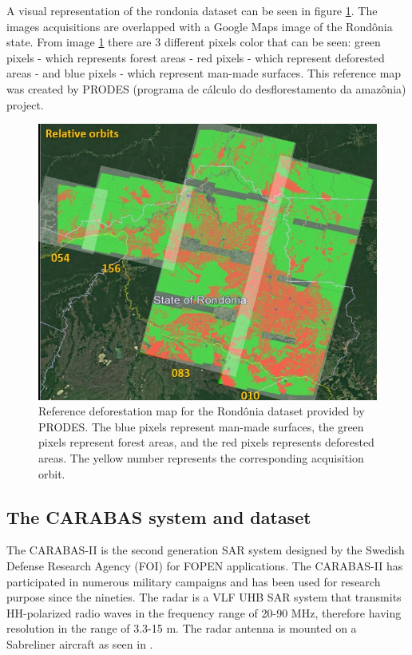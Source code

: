 A visual representation of the rondonia dataset can be seen in figure \ref{fig:rondoniadataset}. The images acquisitions are overlapped with a Google Maps image of the Rondônia state. From image \ref{fig:rondoniadataset} there are 3 different pixels color that can be seen: green pixels - which represents forest areas - red pixels - which represent deforested areas - and blue pixels - which represent man-made surfaces. This reference map was created by PRODES (programa de cálculo do desflorestamento da amazônia) project.

\begin{figure}[H]
    \centering
    \includegraphics[width=\linewidth]{Cap2-Methods/rondonia_dataset.jpg}
    \caption{Reference deforestation map for the Rondônia dataset provided by PRODES. The blue pixels represent man-made surfaces, the green pixels represent forest areas, and the red pixels represents deforested areas. The yellow number represents the corresponding acquisition orbit.}
    \label{fig:rondoniadataset}
\end{figure}{}

\subsection{The CARABAS system and dataset}

The CARABAS-II is the second generation SAR system designed by the Swedish Defense Research Agency (FOI) for FOPEN applications.
The CARABAS-II has participated in numerous military campaigns and has been used for research purpose since the nineties.
The radar is a VLF UHB SAR system that transmits HH-polarized radio waves in the frequency range of 
20-90 MHz, therefore having resolution in the range of 3.3-15 m. The radar antenna is mounted on a Sabreliner aircraft as seen in .

